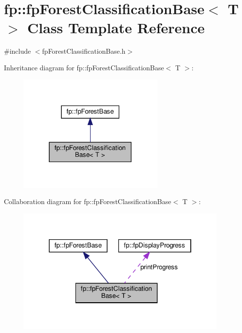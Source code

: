 \hypertarget{classfp_1_1fpForestClassificationBase}{}\section{fp\+:\+:fp\+Forest\+Classification\+Base$<$ T $>$ Class Template Reference}
\label{classfp_1_1fpForestClassificationBase}


{\ttfamily \#include $<$fp\+Forest\+Classification\+Base.\+h$>$}



Inheritance diagram for fp\+:\+:fp\+Forest\+Classification\+Base$<$ T $>$\+:\nopagebreak
\begin{figure}[H]
\begin{center}
\leavevmode
\includegraphics[width=206pt]{classfp_1_1fpForestClassificationBase__inherit__graph}
\end{center}
\end{figure}


Collaboration diagram for fp\+:\+:fp\+Forest\+Classification\+Base$<$ T $>$\+:
\nopagebreak
\begin{figure}[H]
\begin{center}
\leavevmode
\includegraphics[width=298pt]{classfp_1_1fpForestClassificationBase__coll__graph}
\end{center}
\end{figure}
